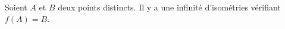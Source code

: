 Soient $A$ et $B$ deux points distincts. Il y a une infinité d'isométries vérifiant $f(A)=B$.

\begin{reponses}
\end{reponses}

